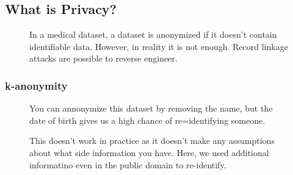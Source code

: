 \documentclass[11pt]{article}
\begin{document}

\subsection{What is Privacy?}

\begin{figure}[H]
    \centering
    \caption{In a medical dataset, a dataset is anonymized if it doesn't contain identifiable data. However, in reality it is not enough. Record linkage attacks are possible to reverse engineer.}
\end{figure}

\subsubsection{k-anonymity}

\begin{figure}[H]
    \centering
\end{figure}

\begin{figure}[H]
    \centering
    \caption{You can annonymize this dataset by removing the name, but the date of birth gives us a high chance of re=identifying someone.}
\end{figure}

\begin{figure}[H]
    \centering
    \caption{This doesn't work in practice as it doesn't make any assumptions about what side information you have. Here, we used additional informatino even in the public domain to re-identify.}
\end{figure}

\begin{figure}[H]
    \centering
\end{figure}
\end{document}
